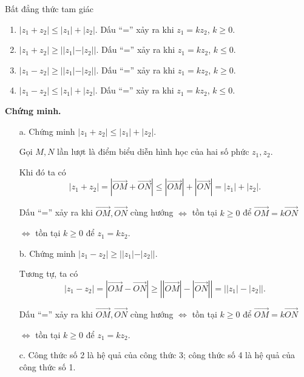 \begin{dang}{Bất đẳng thức tam giác}
	\begin{enumerate}
		\item 	$|z_1 +z_2| \le |z_1| + |z_2|$. Dấu ``='' xảy ra khi $z_1 = k z_2$, $k \ge 0.$
		\item $|z_1 +z_2| \ge ||z_1| - |z_2||$. Dấu ``='' xảy ra khi $z_1 = k z_2$, $k \le 0.$
		\item $|z_1  - z_2| \ge ||z_1| - |z_2||$. Dấu ``='' xảy ra khi $z_1 = k z_2$, $k \ge 0.$
		\item $|z_1 - z_2| \le |z_1| + |z_2|$. Dấu ``='' xảy ra khi $z_1 = k z_2$, $k \le 0.$
	\end{enumerate}
	\textbf{Chứng minh.}\\
	\begin{enumerate}  
		\item [a.] Chứng minh $|z_1 +z_2| \le |z_1| + |z_2|$.  
		
		Gọi $M, N$ lần lượt là điểm biểu diễn hình học của hai số phức $z_1, z_2$.
		
		Khi đó ta có $$|z_1 +z_2| = \left| \overrightarrow{OM} + \overrightarrow{ON} \right| \le \left|\overrightarrow{OM} \right| + \left|\overrightarrow{ON} \right| = |z_1|+|z_2| .$$
		
		Dấu ``='' xảy ra khi $\overrightarrow{OM}, \overrightarrow{ON} $ cùng hướng $\Leftrightarrow $ tồn tại $k \ge 0$ để $\overrightarrow{OM}= k\overrightarrow{ON}  $ 
		
		$\Leftrightarrow$ tồn tại $k \ge 0$ để $ z_1 = k z_2$.
		
		\item [b.] Chứng minh  $|z_1  - z_2| \ge ||z_1| - |z_2||$.
		
		Tương tự, ta có $$|z_1 - z_2| = |\overrightarrow{OM} -  \overrightarrow{ON} | \ge \left| \left| \overrightarrow{OM} \right| -  \left| \overrightarrow{ON} \right| \right|= \left| |z_1|-|z_2| \right|.$$
		
		Dấu ``='' xảy ra khi $\overrightarrow{OM}, \overrightarrow{ON} $ cùng hướng $\Leftrightarrow $ tồn tại $k \ge 0$ để $\overrightarrow{OM}= k\overrightarrow{ON}  $
		
		$\Leftrightarrow$ tồn tại $k \ge 0$ để $ z_1 = k z_2$.  
		\item [c.] Công thức số 2 là hệ quả của công thức 3; công thức số 4 là hệ quả của công thức số 1.
	\end{enumerate}
\end{dang}

